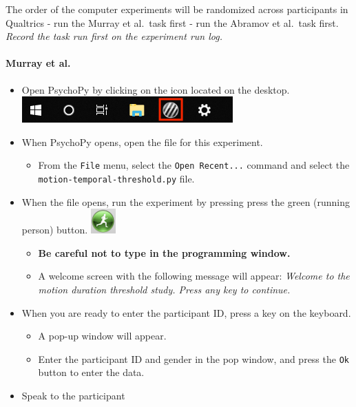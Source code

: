 \documentclass[]{article}
\providecommand{\tightlist}{%
  \setlength{\itemsep}{0pt}\setlength{\parskip}{0pt}}
\let\oldparagraph\paragraph
\renewcommand{\paragraph}[1]{\oldparagraph{#1}\mbox{}}
\begin{document}
The order of the computer experiments will be randomized across
participants in Qualtrics - run the Murray et al.~task first - run the
Abramov et al.~task first. \emph{Record the task run first on the
experiment run log.}

\hypertarget{murray-et-al.}{%
\paragraph{Murray et al.}\label{murray-et-al.}}

\begin{itemize}
\tightlist
\item
  Open PsychoPy by clicking on the icon located on the desktop.
  \includegraphics{images/PsychoPy-1.PNG}\\
\item
  When PsychoPy opens, open the file for this experiment.

  \begin{itemize}
  \tightlist
  \item
    From the \texttt{File} menu, select the \texttt{Open\ Recent...}
    command and select the \texttt{motion-temporal-threshold.py} file.
  \end{itemize}
\item
  When the file opens, run the experiment by pressing press the green
  (running person) button. \includegraphics{images/PPrunningMan.png}

  \begin{itemize}
  \tightlist
  \item
    \textbf{Be careful not to type in the programming window.}
  \item
    A welcome screen with the following message will appear:
    \emph{Welcome to the motion duration threshold study. Press any key
    to continue.}
  \end{itemize}
\item
  When you are ready to enter the participant ID, press a key on the
  keyboard.

  \begin{itemize}
  \tightlist
  \item
    A pop-up window will appear.
  \item
    Enter the participant ID and gender in the pop window, and press the
    \texttt{Ok} button to enter the data.
  \end{itemize}
\item
  Speak to the participant
\end{itemize}
\end{document}
